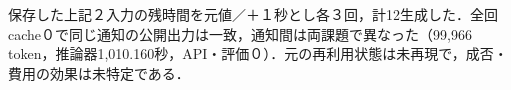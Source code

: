 保存した上記２入力の残時間を元値／＋１秒とし各３回，計12生成した．全回cache０で同じ通知の公開出力は一致，通知間は両課題で異なった（99,966 token，推論器1,010.160秒，API・評価０）．元の再利用状態は未再現で，成否・費用の効果は未特定である．
